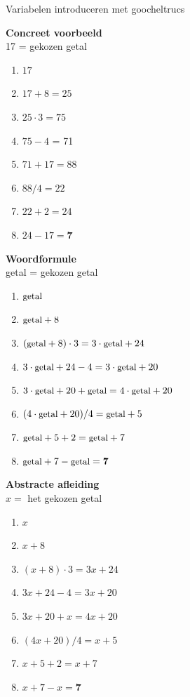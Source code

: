 \begin{lesactiviteit}{Variabelen introduceren met goocheltrucs}
\begin{minipage}[t]{0.25\textwidth}
\textbf{Concreet voorbeeld}\\
17 = gekozen getal
\begin{enumerate}\setlength\itemsep{-0.4em}
  \item $17$
  \item $17 + 8 = 25$
  \item $25 \cdot 3 = 75$
  \item $75 - 4$ = 71
  \item $71 + 17 = 88$
  \item $88/4 = 22$
  \item $22 + 2 = 24$
  \item $24 - 17 = \textbf{7}$
\end{enumerate}
\end{minipage}\hfill
\begin{minipage}[t]{0.40\textwidth}
\textbf{Woordformule}\\
getal = gekozen getal
\begin{enumerate}\setlength\itemsep{-0.4em}
  \item $\text{\small getal}$
  \item $\text{\small getal}+8$
  \item $(\text{\small getal}+8)\cdot 3 = 3\cdot\text{\small getal} + 24$
  \item $3\cdot \text{\small getal}+24-4 = 3\cdot\text{\small getal}+20$
  \item $3\cdot\text{\small getal}+20+\text{\small getal} = 4\cdot\text{\small getal}+ 20$
  \item $(4\cdot\text{\small getal}+20)/4 = \text{\small getal} + 5$
  \item $\text{\small getal} + 5 + 2 = \text{\small getal} + 7$
  \item $\text{\small getal}+7-\text{\small getal} = \textbf{7}$
\end{enumerate}
\end{minipage}\hfill
\begin{minipage}[t]{0.27\textwidth}
\textbf{Abstracte afleiding}\\
$x =$ het gekozen getal
\begin{enumerate}\setlength\itemsep{-0.4em}
  \item $x$
  \item $x+8$
  \item $(x+8)\cdot 3 = 3x + 24$
  \item $3x+24-4 = 3x+20$
  \item $3x+20+x = 4x+ 20$
  \item $(4x+20)/4 = x + 5$
  \item $x + 5 + 2 = x + 7$
  \item $x+7-x = \textbf{7}$
\end{enumerate}
\end{minipage}


\end{lesactiviteit}
